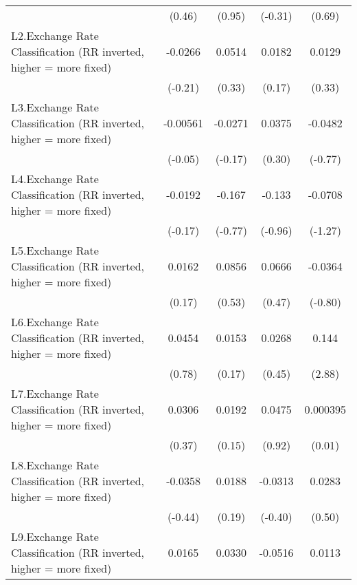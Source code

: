 {\begin{longtable}{l*{4}{c}}
                &   (0.46)         &   (0.95)         &  (-0.31)         &   (0.69)         \\
\addlinespace
L2.Exchange Rate Classification (RR inverted, higher = more fixed)&  -0.0266         &   0.0514         &   0.0182         &   0.0129         \\
                &  (-0.21)         &   (0.33)         &   (0.17)         &   (0.33)         \\
\addlinespace
L3.Exchange Rate Classification (RR inverted, higher = more fixed)& -0.00561         &  -0.0271         &   0.0375         &  -0.0482         \\
                &  (-0.05)         &  (-0.17)         &   (0.30)         &  (-0.77)         \\
\addlinespace
L4.Exchange Rate Classification (RR inverted, higher = more fixed)&  -0.0192         &   -0.167         &   -0.133         &  -0.0708         \\
                &  (-0.17)         &  (-0.77)         &  (-0.96)         &  (-1.27)         \\
\addlinespace
L5.Exchange Rate Classification (RR inverted, higher = more fixed)&   0.0162         &   0.0856         &   0.0666         &  -0.0364         \\
                &   (0.17)         &   (0.53)         &   (0.47)         &  (-0.80)         \\
\addlinespace
L6.Exchange Rate Classification (RR inverted, higher = more fixed)&   0.0454         &   0.0153         &   0.0268         &    0.144\sym{**} \\
                &   (0.78)         &   (0.17)         &   (0.45)         &   (2.88)         \\
\addlinespace
L7.Exchange Rate Classification (RR inverted, higher = more fixed)&   0.0306         &   0.0192         &   0.0475         & 0.000395         \\
                &   (0.37)         &   (0.15)         &   (0.92)         &   (0.01)         \\
\addlinespace
L8.Exchange Rate Classification (RR inverted, higher = more fixed)&  -0.0358         &   0.0188         &  -0.0313         &   0.0283         \\
                &  (-0.44)         &   (0.19)         &  (-0.40)         &   (0.50)         \\
\addlinespace
L9.Exchange Rate Classification (RR inverted, higher = more fixed)&   0.0165         &   0.0330         &  -0.0516         &   0.0113         \\

\end{longtable}}
